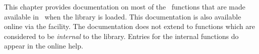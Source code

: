 \label{chap:ref}
This chapter provides documentation on most of the \ML\ functions that are made
available in \HOL\ when the  library is loaded. This documentation
is also available online via the  facility.
The documentation does not extend to functions which are 
considered to be {\it internal\/} to the  library.
Entries for the internal functions do appear in the online help.
